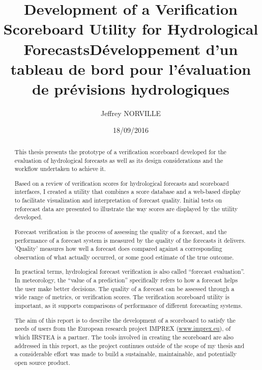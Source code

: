 \documentclass[logos,parttoc,morelanguage=french,morelanguage=german]{orsay-memoire}
\author{Jeffrey \textsc{NORVILLE}}
\title{Development of a Verification Scoreboard Utility for Hydrological Forecasts}
\title[french]{Développement d’un tableau de bord pour l’évaluation de prévisions hydrologiques}
\date{18/09/2016} %
\begin{document}
\maketitle%

\pagestyle{empty}


\begin{abstract}
This thesis presents the prototype of a verification scoreboard developed for the evaluation of hydrological forecasts as well as its design considerations and the workflow undertaken to achieve it.

Based on a review of verification scores for hydrological forecasts and scoreboard interfaces, I created a utility that combines a score database and a web-based display to facilitate visualization and interpretation of forecast quality. Initial tests on reforecast data are presented to illustrate the way scores are displayed by the utility developed.

Forecast verification is the process of assessing the quality of a forecast, and the performance of a forecast system is measured by the quality of the forecasts it delivers. 'Quality' measures how well a forecast does compared against a corresponding observation of what actually occurred, or some good estimate of the true outcome. 

In practical terms, hydrological forecast verification is also called ``forecast evaluation''. In meteorology, the ``value of a prediction'' specifically refers to how a forecast helps the user make better decisions. The quality of a forecast can be assessed through a wide range of metrics, or verification scores. The verification scoreboard utility is important, as it supports comparisons of performance of different forecasting systems.

The aim of this report is to describe the development of a scoreboard to satisfy the needs of users from the European research project IMPREX (\href{http://www.imprex.eu/}{www.imprex.eu}), of which IRSTEA is a partner. The tools involved in creating the scoreboard are also addressed in this report, as the project continues outside of the scope of my thesis and a considerable effort was made to build a sustainable, maintainable, and potentially open source product.
\end{abstract}
\end{document}
